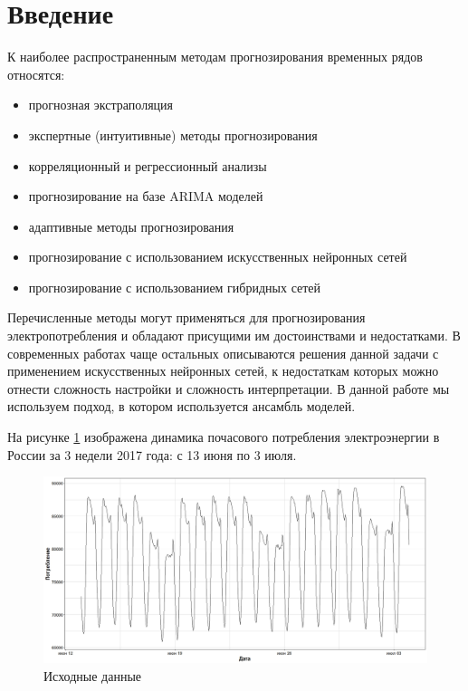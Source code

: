 \documentclass[60x84/16,8pt]{ittmm}
\begin{document}

\maketitle

\section{Введение}
\label{sec:intro}
К наиболее распространенным методам прогнозирования временных рядов относятся:
\begin{itemize}
    \item прогнозная экстраполяция
    \item экспертные (интуитивные) методы прогнозирования
    \item корреляционный и регрессионный анализы
    \item прогнозирование на базе ARIMA моделей
    \item адаптивные методы прогнозирования
    \item прогнозирование с использованием искусственных нейронных сетей
    \item прогнозирование с использованием гибридных сетей
\end{itemize}

Перечисленные методы могут применяться для прогнозирования электропотребления и
обладают присущими им достоинствами и недостатками. В современных работах чаще
остальных описываются решения данной задачи с применением искусственных
нейронных сетей, к недостаткам которых можно отнести сложность настройки и
сложность интерпретации. В данной работе мы используем подход, в котором
используется ансамбль моделей.

На рисунке \ref{fig:data} изображена динамика почасового потребления
электроэнергии в России за 3 недели 2017 года: с 13 июня по 3 июля.
\begin{figure}
  \centering
  \includegraphics[width=0.6\linewidth]{Ru/train_dataset.jpeg}
  \caption{Исходные данные}
  \label{fig:data}
\end{figure}
\end{document}
